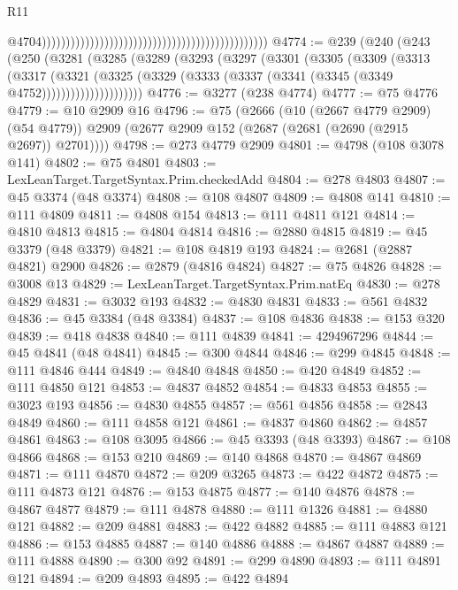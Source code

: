 \begin{lexlean}{R11}
\begin{coremodule}
{{{{{{{{{{{{{{{{{{{{{{{{{{{{{{{{{{{{{{{{{{{{{{{{{{{{{{{{{{{{{{{{{{{{{{{{{{{{{{{{{{                                                                                                  @4704)))))))))))))))))))))))))))))))))))))))))))))))
@4774 := @239
    (@240
      (@243
        (@250
          (@3281
            (@3285
              (@3289
                (@3293
                  (@3297
                    (@3301
                      (@3305
                        (@3309
                          (@3313
                            (@3317
                              (@3321
                                (@3325
                                  (@3329
                                    (@3333 (@3337 (@3341 (@3345 (@3349 @4752)))))))))))))))))))))
@4776 := @3277 (@238 @4774)
@4777 := @75 @4776
@4779 := @10 @2909 @16
@4796 := @75
    (@2666
      (@10 (@2667 @4779 @2909) (@54 @4779))
      @2909
      (@2677 @2909 @152 (@2687 (@2681 (@2690 (@2915 @2697)) @2701))))
@4798 := @273 @4779 @2909
@4801 := @4798 (@108 @3078 @141)
@4802 := @75 @4801
@4803 := LexLeanTarget.TargetSyntax.Prim.checkedAdd
@4804 := @278 @4803
@4807 := @45 @3374 (@48 @3374)
@4808 := @108 @4807
@4809 := @4808 @141
@4810 := @111 @4809
@4811 := @4808 @154
@4813 := @111 @4811 @121
@4814 := @4810 @4813
@4815 := @4804 @4814
@4816 := @2880 @4815
@4819 := @45 @3379 (@48 @3379)
@4821 := @108 @4819 @193
@4824 := @2681 (@2887 @4821) @2900
@4826 := @2879 (@4816 @4824)
@4827 := @75 @4826
@4828 := @3008 @13
@4829 := LexLeanTarget.TargetSyntax.Prim.natEq
@4830 := @278 @4829
@4831 := @3032 @193
@4832 := @4830 @4831
@4833 := @561 @4832
@4836 := @45 @3384 (@48 @3384)
@4837 := @108 @4836
@4838 := @153 @320
@4839 := @418 @4838
@4840 := @111 @4839
@4841 := 4294967296
@4844 := @45 @4841 (@48 @4841)
@4845 := @300 @4844
@4846 := @299 @4845
@4848 := @111 @4846 @444
@4849 := @4840 @4848
@4850 := @420 @4849
@4852 := @111 @4850 @121
@4853 := @4837 @4852
@4854 := @4833 @4853
@4855 := @3023 @193
@4856 := @4830 @4855
@4857 := @561 @4856
@4858 := @2843 @4849
@4860 := @111 @4858 @121
@4861 := @4837 @4860
@4862 := @4857 @4861
@4863 := @108 @3095
@4866 := @45 @3393 (@48 @3393)
@4867 := @108 @4866
@4868 := @153 @210
@4869 := @140 @4868
@4870 := @4867 @4869
@4871 := @111 @4870
@4872 := @209 @3265
@4873 := @422 @4872
@4875 := @111 @4873 @121
@4876 := @153 @4875
@4877 := @140 @4876
@4878 := @4867 @4877
@4879 := @111 @4878
@4880 := @111 @1326
@4881 := @4880 @121
@4882 := @209 @4881
@4883 := @422 @4882
@4885 := @111 @4883 @121
@4886 := @153 @4885
@4887 := @140 @4886
@4888 := @4867 @4887
@4889 := @111 @4888
@4890 := @300 @92
@4891 := @299 @4890
@4893 := @111 @4891 @121
@4894 := @209 @4893
@4895 := @422 @4894
}}}}}}}}}}}}}}}}}}}}}}}}}}}}}}}}}}}}}}}}}}}}}}}}}}}}}}}}}}}}}}}}}}}}}}}}}}}}}}}}}}
\end{coremodule}
\end{lexlean}
